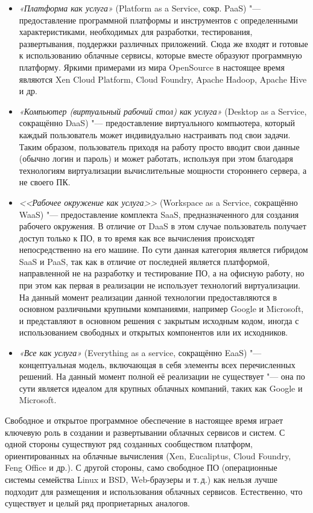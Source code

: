 \documentclass[a5paper,10pt]{article}
\begin{document}
\begin{itemize}
\item \emph{«Платформа как услуга»} (Platform as a Service, сокр. PaaS) "--- предоставление программной платформы и инструментов с определенными характеристиками, необходимых для разработки, тестирования, развертывания, поддержки различных приложений. Сюда же входят и готовые к использованию облачные сервисы, которые вместе образуют программную платформу. Яркими примерами из мира OpenSource в настоящее время являются Xen Cloud Platform, Cloud Foundry, Apache Hadoop, Apache Hive и др.
\item \emph{«Компьютер (виртуальный рабочий стол) как услуга»} (Desk\-top as a Service, сокращённо DaaS) "--- предоставление виртуального компьютера, который каждый пользователь может индивидуально настраивать под свои задачи. Таким образом, пользователь приходя на работу просто вводит свои данные (обычно логин и пароль) и может работать, используя при этом благодаря технологиям виртуализации вычислительные мощности стороннего сервера, а не своего ПК. 
\item \emph{<<Рабочее окружение как услуга>>} (Workspace as a Service, сокращённо WaaS) "--- предоставление комплекта  SaaS, предназначенного для создания рабочего окружения. В отличие от DaaS в этом случае пользователь получает доступ только к ПО, в то время как все вычисления происходят непосредственно на его машине. По сути данная категория является гибридом SaaS и PaaS, так как в отличие от последней является платформой, направленной не на разработку и тестирование ПО, а на офисную работу, но при этом как первая в реализации не использует технологий виртуализации. На данный момент реализации данной технологии предоставляются в основном различными крупными компаниями, например Google и Microsoft, и представляют в основном решения с закрытым исходным кодом, иногда с использованием свободных и открытых компонентов или их исходников.
\item \emph{«Все как услуга»} (Everything as a service, сокращённо EaaS) "--- концептуальная модель, включающая в себя элементы всех перечисленных решений. На данный момент полной её реализации не существует "--- она по сути является идеалом для крупных облачных компаний, таких как Google и Microsoft.
\end{itemize}

Свободное и открытое программное обеспечение в настоящее время играет ключевую роль в создании и развертывании облачных сервисов и систем. С одной стороны существуют ряд созданных сообществом платформ, ориентированных на облачные вычисления (Xen, Eucaliptus, Cloud Foundry, Feng Office и др.). С другой стороны, само свободное ПО (операционные системы семейства Linux и BSD, Web-браузеры и т.\,д.) как нельзя лучше подходит для размещения и использования облачных сервисов.  Естественно, что существует и целый ряд проприетарных аналогов.
\end{document}
